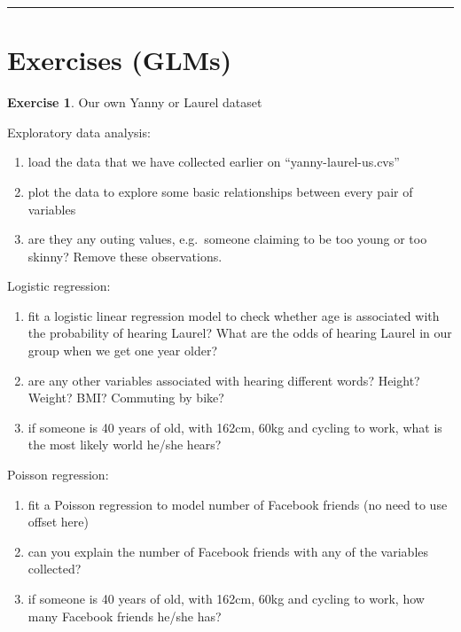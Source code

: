 \documentclass[
]{book}
\providecommand{\tightlist}{%
  \setlength{\itemsep}{0pt}\setlength{\parskip}{0pt}}
\theoremstyle{definition}
\theoremstyle{definition}
\theoremstyle{definition}
\newtheorem{exercise}{Exercise}[chapter]
\theoremstyle{remark}
\begin{document}
\begin{center}\rule{0.5\linewidth}{0.5pt}\end{center}

\hypertarget{exercises-glms}{%
\section{Exercises (GLMs)}\label{exercises-glms}}

\begin{exercise}
\protect\hypertarget{exr:glm-yanny}{}{\label{exr:glm-yanny} }Our own Yanny or Laurel dataset

Exploratory data analysis:

\begin{enumerate}
\def\labelenumi{\alph{enumi})}
\tightlist
\item
  load the data that we have collected earlier on ``yanny-laurel-us.cvs''
\item
  plot the data to explore some basic relationships between every pair of variables
\item
  are they any outing values, e.g.~someone claiming to be too young or too skinny? Remove these observations.
\end{enumerate}

Logistic regression:

\begin{enumerate}
\def\labelenumi{\alph{enumi})}
\setcounter{enumi}{3}
\tightlist
\item
  fit a logistic linear regression model to check whether age is associated with the probability of hearing Laurel? What are the odds of hearing Laurel in our group when we get one year older?
\item
  are any other variables associated with hearing different words? Height? Weight? BMI? Commuting by bike?
\item
  if someone is 40 years of old, with 162cm, 60kg and cycling to work, what is the most likely world he/she hears?
\end{enumerate}

Poisson regression:

\begin{enumerate}
\def\labelenumi{\alph{enumi})}
\setcounter{enumi}{5}
\tightlist
\item
  fit a Poisson regression to model number of Facebook friends (no need to use offset here)
\item
  can you explain the number of Facebook friends with any of the variables collected?
\item
  if someone is 40 years of old, with 162cm, 60kg and cycling to work, how many Facebook friends he/she has?
\end{enumerate}
\end{exercise}
\end{document}
